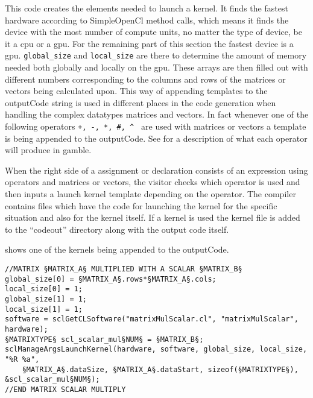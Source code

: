 This code creates the elements needed to launch a kernel.
It finds the fastest hardware according to SimpleOpenCl method calls, which means it finds the device with the most number of compute units, no matter the type of device, be it a \acrshort{cpu} or a \acrshort{gpu}.
For the remaining part of this section the fastest device is a \acrshort{gpu}.
\texttt{global\_size} and \texttt{local\_size} are there to determine the amount of memory needed both globally and locally on the \acrshort{gpu}.
These arrays are then filled out with different numbers corresponding to the columns and rows of the matrices or vectors being calculated upon.
This way of appending templates to the outputCode string is used in different places in the code generation when handling the complex datatypes matrices and vectors.
In fact whenever one of the following operators \texttt{+, -, *, \#, \^{} } are used with matrices or vectors a template is being appended to the outputCode. 
See  for a description of what each operator will produce in \gls{gamble}.

When the right side of a assignment or declaration consists of an expression using operators and matrices or vectors, the visitor checks which operator is used and then inputs a launch kernel template depending on the operator.
The compiler contains files which have the code for launching the kernel for the specific situation and also for the kernel itself.
If a kernel is used the kernel file is added to the ``codeout'' directory along with the output code itself.

 shows one of the kernels being appended to the outputCode.

\begin{lstlisting}[caption=SimpleOpenCL launch of a kernel calculating a matrix or vector multiplied with a scalar.,numbers=none,frame=tlrb,label={lst:kernelLaunch}]
//MATRIX §MATRIX_A§ MULTIPLIED WITH A SCALAR §MATRIX_B§
global_size[0] = §MATRIX_A§.rows*§MATRIX_A§.cols;
local_size[0] = 1;
global_size[1] = 1;
local_size[1] = 1;
software = sclGetCLSoftware("matrixMulScalar.cl", "matrixMulScalar", hardware);
§MATRIXTYPE§ scl_scalar_mul§NUM§ = §MATRIX_B§;
sclManageArgsLaunchKernel(hardware, software, global_size, local_size, "%R %a",
    §MATRIX_A§.dataSize, §MATRIX_A§.dataStart, sizeof(§MATRIXTYPE§), &scl_scalar_mul§NUM§);
//END MATRIX SCALAR MULTIPLY
\end{lstlisting}


